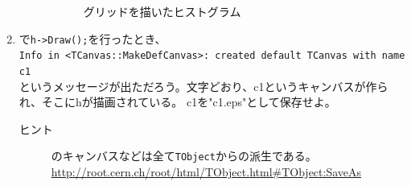 \documentclass{jarticle}
\begin{document}
\begin{enumerate}
\begin{description}
\begin{figure}[htbp]
\begin{center}
		      \end{center}
		      \caption{グリッドを描いたヒストグラム}
		      \label{Fig:hist1canvas2}
		     \end{figure}
	 \end{description}
   \item \ROOT で\verb|h->Draw();|を行ったとき、 \\
	 \verb|Info in <TCanvas::MakeDefCanvas>: created default TCanvas with name c1| \\
	 というメッセージが出ただろう。文字どおり、c1というキャンバスが作られ、そこにhが描画されている。
	 c1を"c1.eps"として保存せよ。
	 \begin{description}
	  \item[ヒント] \ROOT のキャンバスなどは全て\verb|TObject|からの派生である。\\
		     \url{http://root.cern.ch/root/html/TObject.html#TObject:SaveAs}
	 \end{description}

  \end{enumerate}
\end{document}
